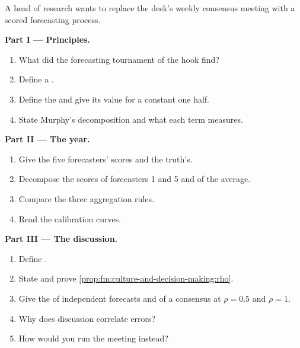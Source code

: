\begin{problem}\label{pb:fm:culture-and-decision-making:1}
A head of research wants to replace the desk's weekly consensus meeting with a scored forecasting process.

\medskip\noindent\textbf{Part I --- Principles.}
\begin{enumerate}
\item What did the forecasting tournament of the hook find?
\item Define a .
\item Define the  and give its value for a constant one half.
\item State Murphy's decomposition and what each term measures.
\end{enumerate}

\medskip\noindent\textbf{Part II --- The year.}
\begin{enumerate}[resume]
\item Give the five forecasters' scores and the truth's.
\item Decompose the scores of forecasters 1 and 5 and of the average.
\item Compare the three aggregation rules.
\item Read the calibration curves.
\end{enumerate}

\medskip\noindent\textbf{Part III --- The discussion.}
\begin{enumerate}[resume]
\item Define .
\item State and prove \cref{prop:fm:culture-and-decision-making:rho}.
\item Give the  of independent forecasts and of a consensus at $\rho=0.5$ and $\rho=1$.
\item Why does discussion correlate errors?
\item How would you run the meeting instead?
\end{enumerate}


\end{problem}
